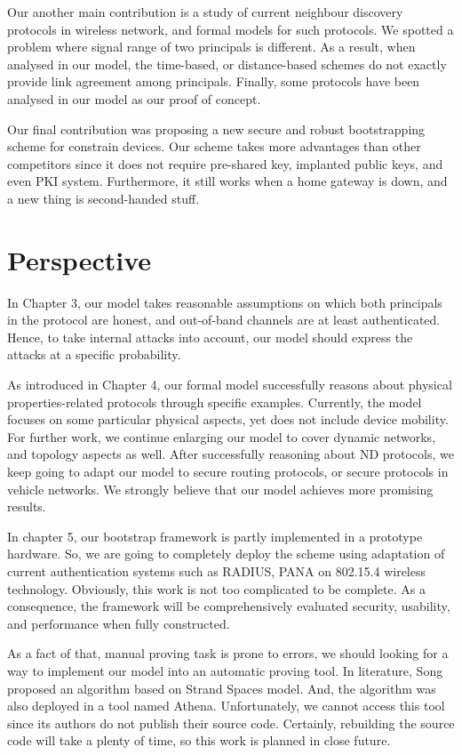 Our another main contribution is a study of current neighbour discovery protocols in wireless network, and formal models for such protocols. We spotted a problem where signal range of two principals is different. As a result, when analysed in our model, the time-based, or distance-based schemes do not exactly provide link agreement among principals. Finally, some protocols have been analysed in our model as our proof of concept. 
 
Our final contribution was proposing a new secure and robust bootstrapping scheme for constrain devices. Our scheme takes more advantages than other competitors since it does not require pre-shared key, implanted public keys, and even PKI system. Furthermore, it still works when a home gateway is down, and a new thing is second-handed stuff. 

\section{Perspective}

In Chapter 3, our model takes reasonable assumptions on which both principals in the protocol are honest, and out-of-band channels are at least authenticated. Hence, to take internal attacks into account, our model should express the attacks at a specific probability.

As introduced in Chapter 4, our formal model successfully reasons about physical properties-related protocols through specific examples. Currently, the model focuses on some particular physical aspects, yet does not include device mobility. For further work, we continue enlarging our model to cover dynamic networks, and topology aspects as well. After successfully reasoning about ND protocols, we keep going to adapt our model to secure routing protocols, or secure protocols in vehicle networks. We strongly believe that our model achieves more promising results. 

In chapter 5, our bootstrap framework is partly implemented in a prototype hardware. So, we are going to completely deploy the scheme using adaptation of current authentication systems such as RADIUS, PANA on 802.15.4 wireless technology. Obviously, this work is not too complicated to be complete. As a consequence, the framework will be comprehensively evaluated security, usability, and performance when fully constructed. 

As a fact of that, manual proving task is prone to errors, we should looking for a way to implement our model into an automatic proving tool. In literature, Song~\cite{Song:1999:ANE:794199.795118} proposed an algorithm based on Strand Spaces model. And, the algorithm was also deployed in a tool named Athena. Unfortunately, we cannot access this tool since its authors do not publish their source code. Certainly, rebuilding the source code will take a plenty of time, so this work is planned in close future. 

